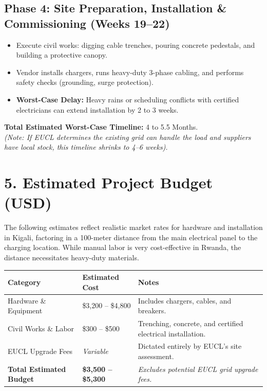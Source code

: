 \documentclass[11pt,a4paper]{article}
\begin{document}
\subsection{Phase 4: Site Preparation, Installation \& Commissioning (Weeks 19--22)}
\begin{itemize}
    \item Execute civil works: digging cable trenches, pouring concrete pedestals, and building a protective canopy.
    \item Vendor installs chargers, runs heavy-duty 3-phase cabling, and performs safety checks (grounding, surge protection).
    \item \textbf{Worst-Case Delay:} Heavy rains or scheduling conflicts with certified electricians can extend installation by 2 to 3 weeks.
\end{itemize}

\textbf{Total Estimated Worst-Case Timeline:} 4 to 5.5 Months. \\
\textit{(Note: If EUCL determines the existing grid can handle the load and suppliers have local stock, this timeline shrinks to 4--6 weeks).}

\section{5. Estimated Project Budget (USD)}
The following estimates reflect realistic market rates for hardware and installation in Kigali, factoring in a 100-meter distance from the main electrical panel to the charging location. While manual labor is very cost-effective in Rwanda, the distance necessitates heavy-duty materials.

\vspace{1em}
\begin{center}
\begin{tabular}{@{}p{5cm} p{3.5cm} p{6cm}@{}}
\toprule
\textbf{Category} & \textbf{Estimated Cost} & \textbf{Notes} \\
\midrule
Hardware \& Equipment & \$3,200 -- \$4,800 & Includes chargers, cables, and breakers. \\
Civil Works \& Labor & \$300 -- \$500 & Trenching, concrete, and certified electrical installation. \\
EUCL Upgrade Fees & \textit{Variable} & Dictated entirely by EUCL's site assessment. \\
\midrule
\textbf{Total Estimated Budget} & \textbf{\$3,500 -- \$5,300} & \textit{Excludes potential EUCL grid upgrade fees.} \\
\bottomrule
\end{tabular}
\end{center}
\end{document}
